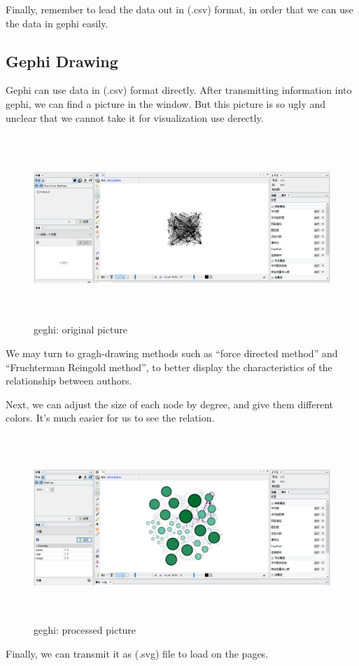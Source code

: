 \documentclass{book}
\begin{document}
Finally, remember to lead the data out in (.csv) format, in order that we can use the data in gephi easily.

\subsection{Gephi Drawing}

Gephi can use data in (.csv) format directly. After transmitting information into gephi, we can find a picture in the window. But this picture is so ugly and unclear that we cannot take it for visualization use derectly.  

\begin{figure}[H]
\centering
\includegraphics[height=7.0cm,width=18.0cm]{img/yhb_ge_1.png}
\caption{geghi: original picture}
\end{figure}
We may turn to gragh-drawing methods such as ``force directed method'' and ``Fruchterman Reingold method'', to better display the characteristics of the relationship between authors.

Next, we can adjust the  size of each node by degree, and give them different colors.
It's much easier for us to see the relation.
\begin{figure}[H]
\centering
\includegraphics[height=7.0cm,width=18.0cm]{img/yhb_ge_2.png}
\caption{geghi: processed picture}
\end{figure}
Finally, we can transmit it as (.svg) file to load on the pages.
\end{document}
